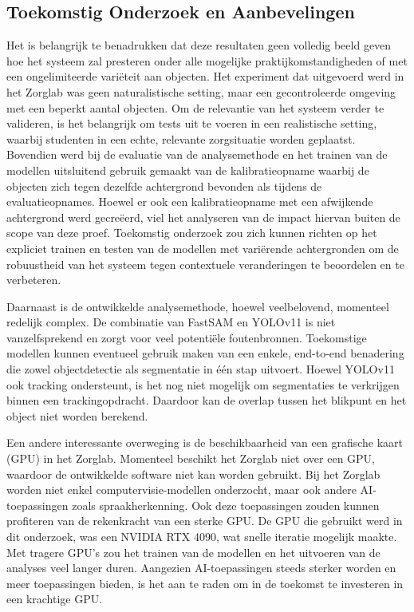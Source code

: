 \subsection{Toekomstig Onderzoek en Aanbevelingen}

Het is belangrijk te benadrukken dat deze resultaten geen volledig beeld geven hoe het 
systeem zal presteren onder alle mogelijke praktijkomstandigheden of met een ongelimiteerde variëteit aan objecten.
Het experiment dat uitgevoerd werd in het Zorglab was geen naturalistische setting,
maar een gecontroleerde omgeving met een beperkt aantal objecten.
Om de relevantie van het systeem verder te valideren, is het belangrijk om tests uit te voeren in een realistische setting,
waarbij studenten in een echte, relevante zorgsituatie worden geplaatst. 
Bovendien werd bij de evaluatie van de analysemethode en het trainen van de modellen uitsluitend gebruik gemaakt van de kalibratieopname 
waarbij de objecten zich tegen dezelfde achtergrond bevonden als tijdens de evaluatieopnames. 
Hoewel er ook een kalibratieopname met een afwijkende achtergrond werd gecreëerd, viel het analyseren van de impact hiervan buiten de scope van deze proef. 
Toekomstig onderzoek zou zich kunnen richten op het expliciet trainen en testen van de modellen met variërende achtergronden om de robuustheid 
van het systeem tegen contextuele veranderingen te beoordelen en te verbeteren.

Daarnaast is de ontwikkelde analysemethode, hoewel veelbelovend, momenteel redelijk complex. 
De combinatie van FastSAM en YOLOv11 is niet vanzelfsprekend en zorgt voor veel potentiële foutenbronnen.
Toekomstige modellen kunnen eventueel gebruik maken van een enkele, end-to-end benadering die zowel objectdetectie als segmentatie in één stap uitvoert.
Hoewel YOLOv11 ook tracking ondersteunt, is het nog niet mogelijk om segmentaties te verkrijgen binnen een trackingopdracht. 
Daardoor kan de overlap tussen het blikpunt en het object niet worden berekend.

Een andere interessante overweging is de beschikbaarheid van een grafische kaart (GPU) in het Zorglab.
Momenteel beschikt het Zorglab niet over een GPU, waardoor de ontwikkelde software niet kan worden gebruikt.
Bij het Zorglab worden niet enkel computervisie-modellen onderzocht, maar ook andere AI-toepassingen zoals spraakherkenning.
Ook deze toepassingen zouden kunnen profiteren van de rekenkracht van een sterke GPU.
De GPU die gebruikt werd in dit onderzoek, was een NVIDIA RTX 4090, wat snelle iteratie mogelijk maakte.
Met tragere GPU's zou het trainen van de modellen en het uitvoeren van de analyses veel langer duren. 
Aangezien AI-toepassingen steeds sterker worden en meer toepassingen bieden, 
is het aan te raden om in de toekomst te investeren in een krachtige GPU.

